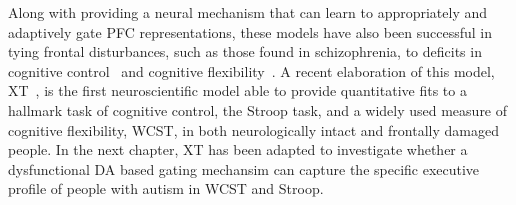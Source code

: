 Along with providing a neural mechanism that can learn to appropriately and adaptively gate PFC representations, these models have also been successful in tying frontal disturbances, such as those found in schizophrenia, to deficits in cognitive control~\cite{CohenJD:1992:Schizophrenia} and cognitive flexibility~\cite{BraverTS:1999:Schizophrenia,OReillyRC:2002:IDED}.  A recent elaboration of this model, XT~\cite{RougierNP:2005:XT}, is the first neuroscientific model able to provide quantitative fits to a hallmark task of cognitive control, the Stroop task, and a widely used measure of cognitive flexibility, WCST, in both neurologically intact and frontally damaged people.  In the next chapter, XT has been adapted to investigate whether a dysfunctional DA based gating mechansim can capture the specific executive profile of people with autism in WCST and Stroop.  




